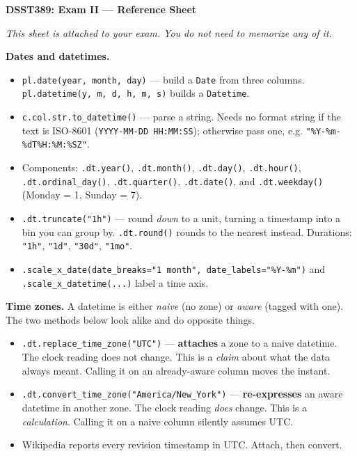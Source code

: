 \documentclass[11pt, a4paper]{article}
\newcommand{\code}[1]{\texttt{#1}}
\begin{document}
\small
\sloppy

\begin{center}
\normalsize\textbf{DSST389: Exam II --- Reference Sheet}
\end{center}

\smallskip

\textit{This sheet is attached to your exam. You do not need to memorize any of it.}

\smallskip

\textbf{Dates and datetimes.}

\begin{itemize}
  \item \code{pl.date(year, month, day)} --- build a \code{Date} from three columns.
        \code{pl.datetime(y, m, d, h, m, s)} builds a \code{Datetime}.
  \item \code{c.col.str.to\_datetime()} --- parse a string. Needs no format string if the
        text is ISO-8601 (\code{YYYY-MM-DD HH:MM:SS}); otherwise pass one, e.g.
        \code{"\%Y-\%m-\%dT\%H:\%M:\%SZ"}.
  \item Components: \code{.dt.year()}, \code{.dt.month()}, \code{.dt.day()},
        \code{.dt.hour()}, \code{.dt.ordinal\_day()}, \code{.dt.quarter()},
        \code{.dt.date()}, and \code{.dt.weekday()} (Monday = 1, Sunday = 7).
  \item \code{.dt.truncate("1h")} --- round \textit{down} to a unit, turning a timestamp into
        a bin you can group by. \code{.dt.round()} rounds to the nearest instead.
        Durations: \code{"1h"}, \code{"1d"}, \code{"30d"}, \code{"1mo"}.
  \item \code{.scale\_x\_date(date\_breaks="1 month", date\_labels="\%Y-\%m")} and
        \code{.scale\_x\_datetime(...)} label a time axis.
\end{itemize}

\smallskip

\textbf{Time zones.}
A datetime is either \textit{naive} (no zone) or \textit{aware} (tagged with one). The two
methods below look alike and do opposite things.

\begin{itemize}
  \item \code{.dt.replace\_time\_zone("UTC")} --- \textbf{attaches} a zone to a naive
        datetime. The clock reading does not change. This is a \textit{claim} about what the
        data always meant. Calling it on an already-aware column moves the instant.
  \item \code{.dt.convert\_time\_zone("America/New\_York")} --- \textbf{re-expresses} an aware
        datetime in another zone. The clock reading \textit{does} change. This is a
        \textit{calculation}. Calling it on a naive column silently assumes UTC.
  \item Wikipedia reports every revision timestamp in UTC. Attach, then convert.
\end{itemize}
\end{document}
